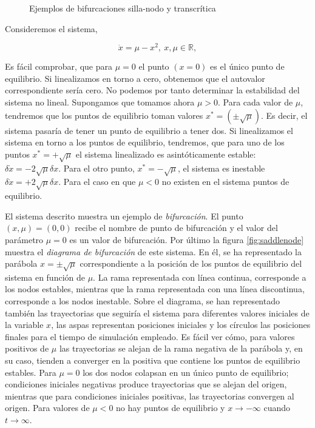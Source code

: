 \begin{example}
\begin{figure}
\caption{Ejemplos de bifurcaciones silla-nodo y transcrítica}
\end{figure}
Consideremos el sistema,

\begin{equation*}
\dot x = \mu - x^2,\  x, \mu \in \mathbb{R},  
\end{equation*}

Es fácil comprobar, que para $\mu =0$ el punto $(x = 0)$ es el único punto de equilibrio. Si linealizamos en torno a cero, obtenemos que el autovalor correspondiente sería cero.  No podemos por tanto determinar la estabilidad del sistema no lineal. Supongamos que tomamos ahora $\mu > 0$. Para cada valor de $\mu$, tendremos que los puntos de equilibrio toman valores $x^* = ( \pm \sqrt{\mu})$. Es decir, el sistema pasaría de tener un punto de equilibrio a tener dos. Si linealizamos el sistema en torno a los puntos de equilibrio, tendremos, que para uno de los puntos $x^*=+\sqrt{\mu}$ el sistema linealizado es asintóticamente estable: $ \delta\dot{x} = -2\sqrt{\mu}\delta x$. Para el otro punto, $x^*=-\sqrt{\mu}$, el sistema es inestable $ \delta \dot{x} = +2\sqrt{\mu}\delta x$.
Para el caso en 	que $\mu<0$ no existen en el sistema puntos de equilibrio.

El sistema descrito muestra un ejemplo de \emph{bifurcación}. El punto $(x,\mu)=(0,0)$ recibe el nombre de punto de bifurcación y el valor del parámetro $\mu = 0$ es un valor de bifurcación. Por último la figura \ref{fig:saddlenode} muestra el \emph{diagrama de bifurcación} de este sistema. En él, se ha representado la parábola $x=\pm \sqrt{\mu}$ correspondiente a la posición de los puntos de equilibrio del sistema en función de $\mu$. La rama representada con línea continua, corresponde a los nodos estables, mientras que la rama representada con una línea discontinua, corresponde a los nodos inestable. Sobre el diagrama, se han representado también las trayectorias que seguiría el sistema para diferentes valores iniciales de la variable $x$, las  aspas representan posiciones iniciales y los círculos las posiciones finales para el tiempo de simulación empleado. Es fácil ver cómo, para valores positivos de $\mu$  las trayectorias se alejan de la rama negativa de la parábola y, en su caso, tienden a converger en la positiva que contiene los puntos de equilibrio estables. Para $\mu =0$ los dos nodos colapsan en un único punto de equilibrio; condiciones iniciales negativas produce trayectorias que se alejan del origen, mientras que para condiciones iniciales positivas, las trayectorias convergen al origen. Para valores de $\mu<0$ no hay puntos de equilibrio y $x\to -\infty$ cuando $t\to \infty$.


\end{example}
